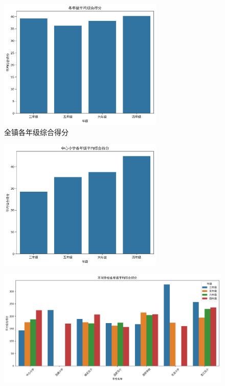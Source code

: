 \documentclass{article}
\begin{document}
\begin{figure}[H]
    \centering
    \includegraphics[width=0.7\textwidth]{fig/4.png}
    \caption{全镇各年级综合得分}
\end{figure}

\begin{figure}[H]
    \centering
    \includegraphics[width=0.7\textwidth]{fig/5.png}
\end{figure}

\begin{figure}[H]
    \centering
    \includegraphics[width=1\textwidth]{fig/6.png}
\end{figure}
\end{document}
